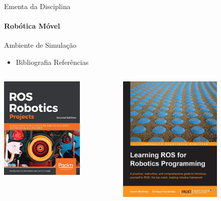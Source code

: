 \documentclass{beamer}
\begin{document}
\begin{frame}[t]{Ementa da Disciplina}
	\framesubtitle{Robótica Móvel}
	\begin{block}{Ambiente de Simulação}
	\end{block}
	\begin{itemize}
		\item Bibliografia Referências
	\end{itemize}
	\begin{columns}[c]
		\begin{column}{0.5\textwidth}
			\center
			\includegraphics[width=0.7\textwidth]{./images/livro7}
		\end{column}
		\begin{column}{0.5\textwidth}
			\center
			\includegraphics[width=0.7\textwidth]{./images/livro8}
		\end{column}
	\end{columns}
\end{frame}
\end{document}
